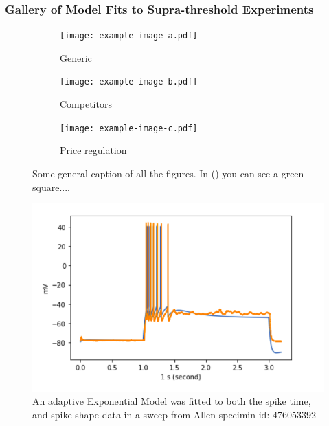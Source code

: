 \subsubsection{Gallery of Model Fits to Supra-threshold Experiments}

\begin{figure}
    \centering
    \begin{subfigure}[t]%
        \centering
        \texttt{[image: example-image-a.pdf]} 
        \caption{Generic} \label{fig:timing1}
    \end{subfigure}
    \hfill
    \begin{subfigure}[t]%
        \centering
        \texttt{[image: example-image-b.pdf]} 
        \caption{Competitors} \label{fig:timing2}
    \end{subfigure}

    \vspace{1cm}
    \begin{subfigure}[t]%
        \centering
        \texttt{[image: example-image-c.pdf]} 
        \caption{Price regulation} \label{fig:timing3}
    \end{subfigure}
    \hfill
    \caption{Some general caption of all the figures. In () you can see a  green square....}
\end{figure}


\begin{figure}
    \centering
    \includegraphics[scale=0.75]{figures/adexp_fit_allen_spec_id_476053392.png}
    \caption{An adaptive Exponential Model was fitted to both the spike time, and spike shape data in a sweep from Allen specimin id: 476053392} \label{fig:specimen_476053392}
\end{figure}

